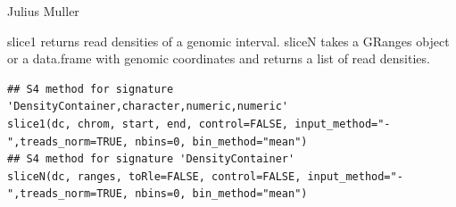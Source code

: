 \documentclass[letterpaper]{book}
\begin{document}
%
\begin{Author}
Julius Muller 
\end{Author}
%
\begin{Examples}
\end{Examples}
%
\begin{Description}

slice1 returns read densities of a genomic interval. sliceN takes a GRanges object or a data.frame with 
genomic coordinates and returns a list of read densities. 

\end{Description}
%
\begin{Usage}
\begin{verbatim}
## S4 method for signature 'DensityContainer,character,numeric,numeric'
slice1(dc, chrom, start, end, control=FALSE, input_method="-",treads_norm=TRUE, nbins=0, bin_method="mean")
## S4 method for signature 'DensityContainer'
sliceN(dc, ranges, toRle=FALSE, control=FALSE, input_method="-",treads_norm=TRUE, nbins=0, bin_method="mean")
\end{verbatim}
\end{Usage}
%
\end{document}
